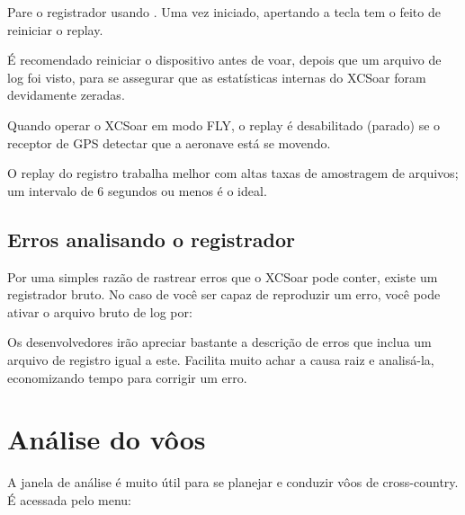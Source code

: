 Pare o registrador usando   .
Uma vez iniciado, apertando a tecla   tem o feito de reiniciar o replay.

\tip É recomendado reiniciar o dispositivo antes de voar, depois que um arquivo de log foi visto, para se assegurar que as estatísticas internas do XCSoar foram devidamente zeradas.

Quando operar o XCSoar em modo FLY, o replay é desabilitado (parado) se o receptor de GPS detectar que a aeronave está se movendo.

O replay do registro trabalha melhor com altas taxas de amostragem de arquivos; um intervalo de 6 segundos ou menos é o ideal.


\subsection*{Erros analisando o registrador}\label{sec:raw-logger} Por uma simples razão de rastrear erros que o XCSoar pode conter, existe um registrador bruto.  No caso de você ser capaz de reproduzir um erro, você pode ativar o arquivo bruto de log por:
\begin{quote}
\blink{}
\end{quote}
Os desenvolvedores irão apreciar bastante a descrição de erros que inclua um arquivo de registro igual a este.  Facilita muito achar a causa raiz e analisá-la, economizando tempo para corrigir um erro.  

\section{Análise do vôos} \label{sec:analysis-climb}

A janela de análise é muito útil para se planejar e conduzir vôos de cross-country.  É acessada pelo menu: 
\begin{quote}
\blink{}
\end{quote}

